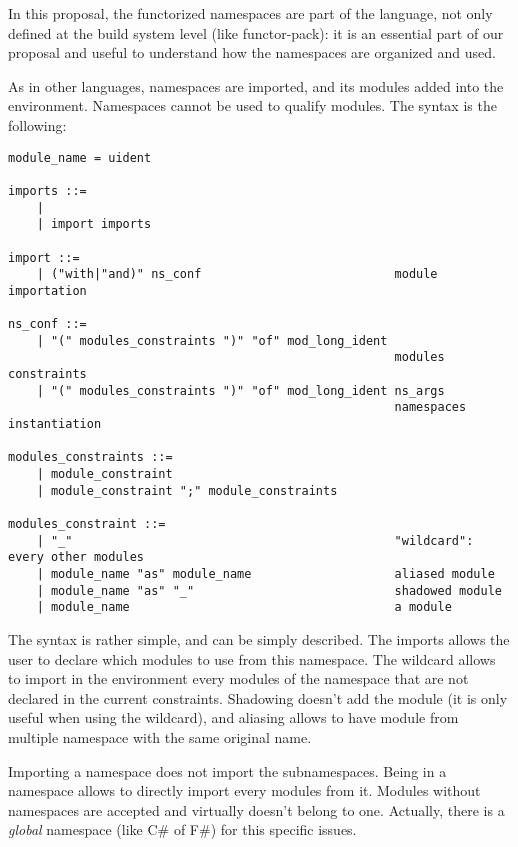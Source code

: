\documentclass[11pt,a4paper]{article}
\begin{document}
In this proposal, the functorized namespaces are part of the language, not only
defined at the build system level (like functor-pack): it is an essential part
of our proposal and useful to understand how the namespaces are organized and
used.

\medskip

As in other languages, namespaces are imported, and its modules added into the
environment. Namespaces cannot be used to qualify modules. The syntax is the
following:

\begin{verbatim}
module_name = uident

imports ::=
    | 
    | import imports 

import ::=
    | ("with|"and)" ns_conf                           module importation    

ns_conf ::=
    | "(" modules_constraints ")" "of" mod_long_ident 
                                                      modules constraints
    | "(" modules_constraints ")" "of" mod_long_ident ns_args 
                                                      namespaces instantiation 

modules_constraints ::=
    | module_constraint
    | module_constraint ";" module_constraints

modules_constraint ::=
    | "_"                                             "wildcard": every other modules
    | module_name "as" module_name                    aliased module
    | module_name "as" "_"                            shadowed module
    | module_name                                     a module
\end{verbatim}

The syntax is rather simple, and can be simply described. The imports allows the
user to declare which modules to use from this namespace. The wildcard allows to
import in the environment every modules of the namespace that are not declared
in the current constraints. Shadowing doesn't add the module (it is only useful
when using the wildcard), and aliasing allows to have module from multiple
namespace with the same original name.

Importing a namespace does not import the subnamespaces. Being in a namespace
allows to directly import every modules from it. Modules without namespaces are
accepted and virtually doesn't belong to one. Actually, there is a \emph{global}
namespace (like C\# of F\#) for this specific issues.
\end{document}
